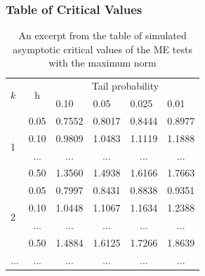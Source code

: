 \documentclass[9pt]{beamer}
\begin{document}
\begin{frame}[fragile]
  \frametitle{Table of Critical Values}
  \begin{table}[]
    \centering
\begin{tabular}{|l|l|l|l|l|l|}
\hline
\multirow{2}{*}{$k$}      & \multicolumn{1}{c|}{\multirow{2}{*}{h}} & \multicolumn{4}{c|}{Tail probability}                                                                     \\ \cline{3-6} 
                          & \multicolumn{1}{c|}{}                   & 0.10                     & 0.05                     & 0.025                    & 0.01                     \\ \hline
\multirow{4}{*}{1}        & 0.05                                    & 0.7552                   & 0.8017                   & 0.8444                   & 0.8977                   \\ \cline{2-6} 
                          & 0.10                                    & 0.9809                   & 1.0483                   & 1.1119                   & 1.1888                   \\ \cline{2-6} 
                          & \multicolumn{1}{c|}{...}                & \multicolumn{1}{c|}{...} & \multicolumn{1}{c|}{...} & \multicolumn{1}{c|}{...} & \multicolumn{1}{c|}{...} \\ \cline{2-6} 
                          & 0.50                                    & 1.3560                   & 1.4938                   & 1.6166                   & 1.7663                   \\ \hline
\multirow{4}{*}{2}        & 0.05                                    & 0.7997                   & 0.8431                   & 0.8838                   & 0.9351                   \\ \cline{2-6} 
                          & 0.10                                    & 1.0448                   & 1.1067                   & 1.1634                   & 1.2388                   \\ \cline{2-6} 
                          & \multicolumn{1}{c|}{...}                & \multicolumn{1}{c|}{...} & \multicolumn{1}{c|}{...} & \multicolumn{1}{c|}{...} & \multicolumn{1}{c|}{...} \\ \cline{2-6} 
                          & 0.50                                    & 1.4884                   & 1.6125                   & 1.7266                   & 1.8639                   \\ \hline
\multicolumn{1}{|c|}{...} & \multicolumn{1}{c|}{...}                & \multicolumn{1}{c|}{...} & \multicolumn{1}{c|}{...} & \multicolumn{1}{c|}{...} & \multicolumn{1}{c|}{...} \\ \hline
\end{tabular}
\caption{An excerpt from the table of simulated asymptotic critical values of the
  ME tests with the maximum norm}
\label{table:critvals}
\end{table}
\end{frame}
\end{document}
